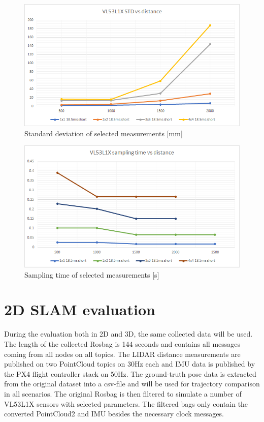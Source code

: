 \begin{figure}[!h]
    \centering
	\includegraphics[width=115mm, keepaspectratio]{figures/vl53l1x_measurements_03_std.png}
    \caption{Standard deviation of selected measurements [mm]}
    \label{fig:vl53l1x_meas_further_detailed_std}
\end{figure}


\begin{figure}[!h]
    \centering
	\includegraphics[width=115mm, keepaspectratio]{figures/vl53l1x_measurements_03_ts.png}
    \caption{Sampling time of selected measurements [s]}
    \label{fig:vl53l1x_meas_further_detailed_ts}
\end{figure}

\newpage








\section{2D SLAM evaluation}
During the evaluation both in 2D and 3D, the same collected data will be used. The length
of the collected Rosbag is 144 seconds and contains all messages coming from all nodes on all
topics. The LIDAR distance measurements are published on two PointCloud topics on 30Hz each
and IMU data is published by the PX4 flight controller stack on 50Hz.
The ground-truth pose data is extracted from the original dataset into a csv-file and will
be used for trajectory comparison in all scenarios. The original Rosbag is then filtered
to simulate a number of VL53L1X sensors with selected parameters. The filtered bags only
contain the converted PointCloud2 and IMU besides the necessary clock messages.

